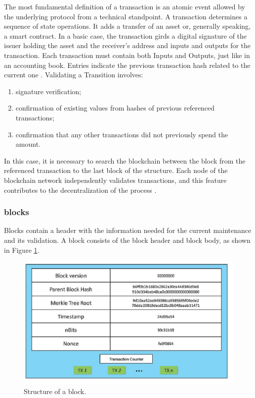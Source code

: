 The most fundamental definition of a transaction is an atomic event allowed by the underlying protocol from a technical standpoint. A transaction determines a sequence of state operations.  It adds a transfer of an asset or, generally speaking, a smart contract.  In a basic case, the transaction girds a digital signature of the issuer holding the asset and the receiver's address and inputs and outputs for the transaction. Each transaction must contain both Inputs and Outputs, just like in an accounting book. Entries indicate the previous transaction hash related to the current one \cite{greve2018blockchain}. Validating a Transition involves:

\begin{enumerate}
	\item signature verification;
	\item confirmation of existing values from hashes of previous referenced transactions;
	\item confirmation that any other transactions did not previously spend the amount.
\end{enumerate}

In this case, it is necessary to search the blockchain between the block from the referenced transaction to the last block of the structure. Each node of the blockchain network independently validates transactions, and this feature contributes to the decentralization of the process \cite{greve2018blockchain}.

\subsubsection{blocks}\label{sec:blocks}
Blocks contain a header with the information needed for the current maintenance and its validation. A block consists of the block header and block body, as shown in Figure \ref{fig:block}. 

\begin{figure}[htbp]
\begin{center}
  \includegraphics[scale=0.5]{images/blockStructure.png}
\caption{Structure of a block. \cite{zheng2016blockchain}}
\label{fig:block}
\end{center}
\end{figure}

